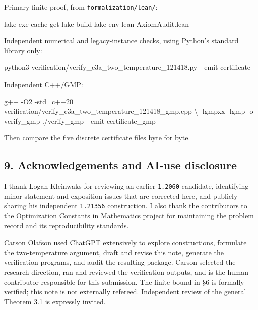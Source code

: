 \documentclass[
  10pt,
]{article}
\newenvironment{Shaded}{}{}
\newcommand{\AttributeTok}[1]{\textcolor[rgb]{0.49,0.56,0.16}{#1}}
\newcommand{\DataTypeTok}[1]{\textcolor[rgb]{0.56,0.13,0.00}{#1}}
\newcommand{\ExtensionTok}[1]{#1}
\newcommand{\NormalTok}[1]{#1}
\newcommand{\OperatorTok}[1]{\textcolor[rgb]{0.40,0.40,0.40}{#1}}
\begin{document}
Primary finite proof, from \texttt{formalization/lean/}:

\begin{Shaded}
\begin{Highlighting}[]
\ExtensionTok{lake}\NormalTok{ exe cache get}
\ExtensionTok{lake}\NormalTok{ build}
\ExtensionTok{lake}\NormalTok{ env lean AxiomAudit.lean}
\end{Highlighting}
\end{Shaded}

Independent numerical and legacy-instance checks, using Python's
standard library only:

\begin{Shaded}
\begin{Highlighting}[]
\ExtensionTok{python3}\NormalTok{ verification/verify\_c3a\_two\_temperature\_121418.py }\AttributeTok{{-}{-}emit}\NormalTok{ certificate}
\end{Highlighting}
\end{Shaded}

Independent C++/GMP:

\begin{Shaded}
\begin{Highlighting}[]
\ExtensionTok{g++} \AttributeTok{{-}O2} \AttributeTok{{-}std}\OperatorTok{=}\NormalTok{c++20 verification/verify\_c3a\_two\_temperature\_121418\_gmp.cpp }\DataTypeTok{\textbackslash{}}
  \AttributeTok{{-}lgmpxx} \AttributeTok{{-}lgmp} \AttributeTok{{-}o}\NormalTok{ verify\_gmp}
\ExtensionTok{./verify\_gmp} \AttributeTok{{-}{-}emit}\NormalTok{ certificate\_gmp}
\end{Highlighting}
\end{Shaded}

Then compare the five discrete certificate files byte for byte.

\subsection{9. Acknowledgements and AI-use
disclosure}\label{acknowledgements-and-ai-use-disclosure}

I thank Logan Kleinwaks for reviewing an earlier \texttt{1.2060}
candidate, identifying minor statement and exposition issues that are
corrected here, and publicly sharing his independent \texttt{1.21356}
construction. I also thank the contributors to the Optimization
Constants in Mathematics project for maintaining the problem record and
its reproducibility standards.

Carson Olafson used ChatGPT extensively to explore constructions,
formulate the two-temperature argument, draft and revise this note,
generate the verification programs, and audit the resulting package.
Carson selected the research direction, ran and reviewed the
verification outputs, and is the human contributor responsible for this
submission. The finite bound in §6 is formally verified; this note is
not externally refereed. Independent review of the general Theorem 3.1
is expressly invited.
\end{document}
